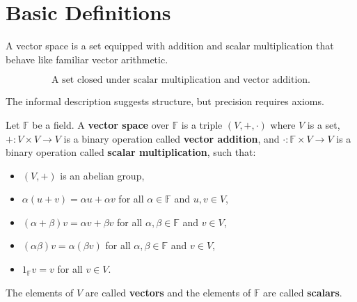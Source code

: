 
\section{Basic Definitions}

\begin{definition}
\label{def:vector-space-informal}
A vector space is a set equipped with addition and scalar multiplication
that behave like familiar vector arithmetic.
\end{definition}

\begin{remark*}
\[ \text{A set closed under scalar multiplication and vector addition.} \]
\end{remark*}

\begin{remark*}[Flash]
\end{remark*}

\begin{remark*}
The informal description suggests structure, but precision requires axioms.
\end{remark*}

\begin{definition}
\label{def:vector-space}
Let $\mathbb{F}$ be a field.
A \textbf{vector space} over $\mathbb{F}$ is a triple $(V, +, \cdot)$ where $V$ is a set,
$+: V \times V \to V$ is a binary operation called \textbf{vector addition}, and
$\cdot : \mathbb{F} \times V \to V$ is a binary operation called \textbf{scalar multiplication},
such that:

\begin{itemize}
    \item $(V, +)$ is an abelian group,
    \item $\alpha (u + v) = \alpha u + \alpha v$
          for all $\alpha \in \mathbb{F}$ and $u, v \in V$,
    \item $(\alpha + \beta) v = \alpha v + \beta v$
          for all $\alpha, \beta \in \mathbb{F}$ and $v \in V$,
    \item $(\alpha \beta) v = \alpha (\beta v)$
          for all $\alpha, \beta \in \mathbb{F}$ and $v \in V$,
    \item $1_{\mathbb{F}} v = v$ for all $v \in V$.
\end{itemize}

The elements of $V$ are called \textbf{vectors} and the elements of $\mathbb{F}$
are called \textbf{scalars}.
\end{definition}

